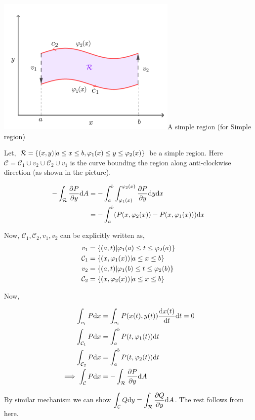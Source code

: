 \documentclass[../Analysis-3]{subfiles}
\begin{document}
\begin{proofFig}{\includegraphics[width=.78\linewidth]{../figures/lec-28.1.png}}{A simple region} (for Simple region)

    Let, $\mathcal{R} = \qty{(x,y) | a\le x\le b, \varphi_1(x) \le y \le \varphi_2(x)}$ be a simple region. Here $\mathcal{C} = \mathcal{C}_1 \cup v_2 \cup \mathcal{C}_2 \cup v_1$ is the curve bounding the region along anti-clockwise direction (as shown in the picture).

    \begin{align*}
        -\int_{\mathcal{R}} \pdv{P}{y} \dd A & = -\int_{a}^{b} \int_{\varphi_1(x)}^{\varphi_2(x)} \pdv{P}{y} \dd y \dd x \\
                                             & = - \int_{a}^{b} (P(x,\varphi_2(x))-P(x,\varphi_1(x))) \dd x              \\
    \end{align*}

    Now, $\mathcal{C}_1,\mathcal{C}_2,v_1,v_2$ can be explicitly written as,
    \begin{align*}
        v_1           & = \qty{(a,t) | \varphi_1(a) \le t \le \varphi_2(a)} \\
        \mathcal{C}_1 & = \qty{(x,\varphi_1(x)) | a \le x \le b}            \\
        v_2           & = \qty{(a,t) | \varphi_1(b) \le t \le \varphi_2(b)} \\
        \mathcal{C}_2 & = \qty{(x,\varphi_2(x)) | a \le x \le b}
    \end{align*}

    Now,

    \begin{align*}
        \int_{v_1} P \dd x                 & = \int_{v_1} P(x(t),y(t)) \dv{x(t)}{t} \dd t = 0 \\
        \int_{\mathcal{C}_1} P \dd x       & = \int_{a}^{b} P(t,\varphi_1(t)) \dd t           \\
        \int_{\mathcal{C}_2} P \dd x       & = \int_{a}^{b} P(t,\varphi_2(t)) \dd t           \\
        \implies \int_{\mathcal{C}} P\dd x & = -\int_{\mathcal{R}} \pdv{P}{y} \dd A
    \end{align*}


    By similar mechanism we can show $\displaystyle\int_{\mathcal{C}} Q \dd y = \int_{\mathcal{R}} \pdv{Q}{y} \dd A$. The rest follows from here.
\end{proofFig}
\end{document}
